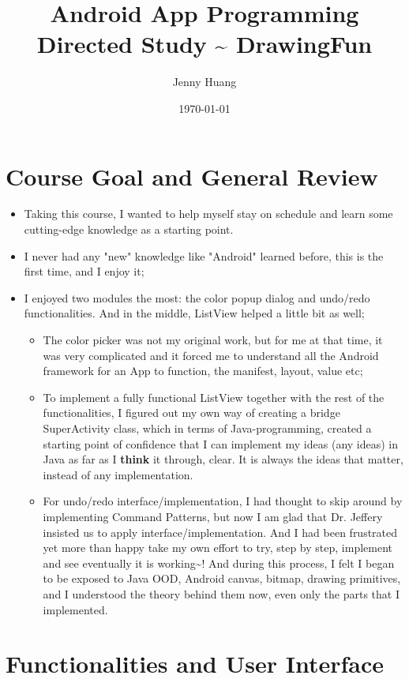 \documentclass[9pt,b5paper]{article}
\author{Jenny Huang}
\date{\today}
\title{Android App Programming Directed Study \textasciitilde{} DrawingFun}
\begin{document}
\maketitle


\section{Course Goal and General Review}
\label{sec-1}
\begin{itemize}
\item Taking this course, I wanted to help myself stay on schedule and learn some cutting-edge knowledge as a starting point.
\item I never had any "new" knowledge like "Android" learned before, this is the first time, and I enjoy it;
\item I enjoyed two modules the most: the color popup dialog and undo/redo functionalities. And in the middle, ListView helped a little bit as well;
\begin{itemize}
\item The color picker was not my original work, but for me at that time, it was very complicated and it forced me to understand all the Android framework for an App to function, the manifest, layout, value etc;
\item To implement a fully functional ListView together with the rest of the functionalities, I figured out my own way of creating a bridge SuperActivity class, which in terms of Java-programming, created a starting point of confidence that I can implement my ideas (any ideas) in Java as far as I \textbf{think} it through, clear. It is always the ideas that matter, instead of any implementation.
\item For undo/redo interface/implementation, I had thought to skip around by implementing Command Patterns, but now I am glad that Dr. Jeffery insisted us to apply interface/implementation. And I had been frustrated yet more than happy take my own effort to try, step by step, implement and see eventually it is working\textasciitilde{}! And during this process, I felt I began to be exposed to Java OOD, Android canvas, bitmap, drawing primitives, and I understood the theory behind them now, even only the parts that I implemented.
\end{itemize}
\end{itemize}

\section{Functionalities and User Interface}
\label{sec-2}
\end{document}
